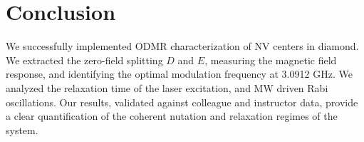 \documentclass[aps,prb,reprint,amsmath,amssymb,floatfix]{revtex4-2}
\begin{document}
\section{Conclusion}

We successfully implemented ODMR characterization of NV centers in diamond. We extracted the zero-field splitting $D$ and $E$, measuring the magnetic field response, and identifying the optimal modulation frequency at 3.0912 GHz. We analyzed the relaxation time of the laser excitation, and MW driven Rabi oscillations. Our results, validated against colleague and instructor data, provide a clear quantification of the coherent nutation and relaxation regimes of the system.



\end{document}
